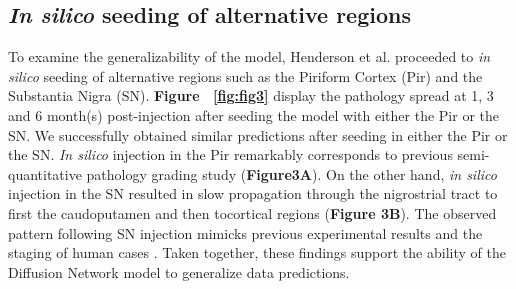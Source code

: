 \subsection{\textit{In silico} seeding of alternative regions}
To examine the generalizability of the model, Henderson et al. proceeded to \textit{in silico} seeding of alternative regions such as the Piriform Cortex (Pir) and the Substantia Nigra (SN). \textbf{Figure ~\ref{fig:fig3}} display the pathology spread at 1, 3 and 6 month(s) post-injection after seeding the model with either the Pir or the SN. We successfully obtained similar predictions after seeding in either the Pir or the SN. \textit{In silico} injection in the Pir remarkably corresponds to previous semi-quantitative pathology grading study \cite{Rey_2016} (\textbf{Figure3A}). On the other hand, \textit{in silico} injection in the SN resulted in slow propagation through the nigrostrial tract to first the caudoputamen and then tocortical regions (\textbf{Figure 3B}). The observed pattern following SN injection mimicks previous experimental results and the staging of human cases \cite{Recasens_2014,  Bourdenx_2020}. Taken together, these findings support the ability of the Diffusion Network model to generalize data predictions.

